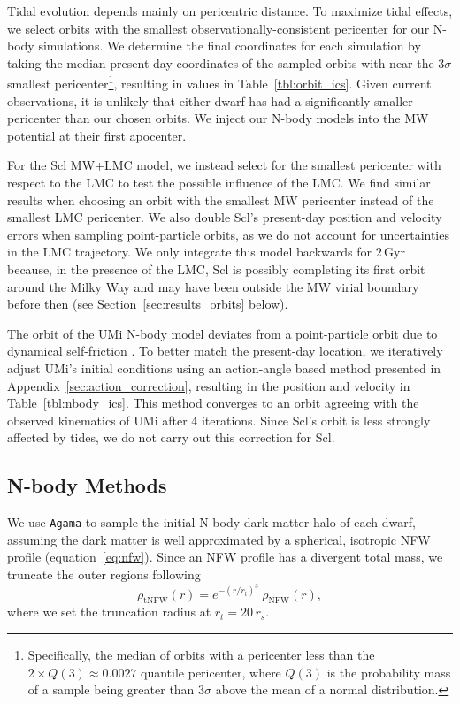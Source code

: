 \documentclass[linenumbers, twocolumn, twocolappendix]{aastex701}
\newcommand{\Gyr}{\text{Gyr}}
\newcommand{\agama}{\texttt{Agama}}
\begin{document}
Tidal evolution depends mainly on pericentric distance. To maximize tidal effects, we select orbits with the smallest observationally-consistent pericenter for our N-body simulations.
We determine the final coordinates for each simulation by taking the median present-day coordinates of the sampled orbits with near the $3\sigma$ smallest pericenter\footnote{
    Specifically, the median of orbits with a pericenter less than the $2\times Q(3)\approx 0.0027$ quantile pericenter, where $Q(3)$ is the probability mass of a sample being greater than $3\sigma$ above the mean of a normal distribution.
}, resulting in values in Table~\ref{tbl:orbit_ics}. 
Given current observations, it is unlikely that either dwarf has had a significantly smaller pericenter than our chosen orbits.
We inject our N-body models into the MW potential at their first apocenter. 


For the Scl MW+LMC model, we instead select for the smallest pericenter with respect to the LMC to test the possible influence of the LMC. We find similar results when choosing an orbit with the smallest MW pericenter instead of the smallest LMC pericenter. We also double Scl's present-day position and velocity errors when sampling point-particle orbits, as we do not account for uncertainties in the LMC trajectory. We only integrate this model backwards for $2\,\Gyr$ because, in the presence of the LMC, Scl is possibly completing its first orbit around the Milky Way and may have been outside the MW virial boundary before then (see Section~\ref{sec:results_orbits} below). 

The orbit of the UMi N-body model deviates from a point-particle orbit due to dynamical self-friction \citep[e.g.,][]{white1983}. To better match the present-day location, we iteratively adjust UMi's initial conditions using an action-angle based method presented in Appendix~\ref{sec:action_correction}, resulting in the position and velocity in Table~\ref{tbl:nbody_ics}. This method converges to an orbit agreeing
with the observed kinematics of UMi after 4 iterations.
Since Scl's orbit is less
strongly affected by tides, we do not carry out this correction for Scl.





\subsection{N-body Methods} \label{sec:nbody_methods}

We use \agama{} \citep{agama} to sample the initial N-body dark matter
halo of each dwarf, assuming the dark matter is well approximated by a spherical, isotropic NFW profile (equation~\ref{eq:nfw}). 
Since an NFW profile has a divergent total mass, we truncate the outer regions following
\begin{equation}\label{eq:trunc_nfw}
    \rho_\text{tNFW}(r) = e^{-(r/r_t)^3}\ \rho_\text{NFW}(r),
\end{equation}
where we set the truncation radius at $r_t = 20 \, r_s$. 
\end{document}
